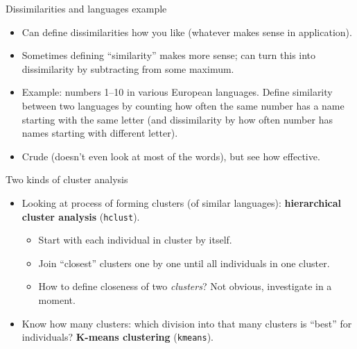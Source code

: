 \documentclass[unknownkeysallowed]{beamer}\usepackage[]{graphicx}\usepackage[]{color}
\begin{document}
\begin{frame}[fragile]{Dissimilarities and languages example}

  \begin{itemize}
  \item Can define dissimilarities how you like (whatever makes sense in application).
  \item Sometimes defining ``similarity'' makes more sense; can turn this into dissimilarity by subtracting from some maximum.
  \item Example: numbers 1--10 in various European languages. Define
    similarity between two languages by counting how often the same
    number has a name starting with the same letter (and dissimilarity
    by how often number has names starting with different letter).
  \item Crude (doesn't even look at most of the words), but see how effective.
  \end{itemize}
  
\end{frame}

\begin{frame}[fragile]{Two kinds of cluster analysis}

  \begin{itemize}
  \item Looking at process of forming clusters (of similar languages):
    \textbf{hierarchical cluster analysis} (\texttt{hclust}).
    \begin{itemize}
    \item Start with each individual in cluster by itself.
    \item Join ``closest'' clusters one by one until all individuals in one cluster.
    \item How to define closeness of two \emph{clusters}? Not obvious,
      investigate in a moment.
    \end{itemize}
  \item Know how many clusters: which division into that many clusters
    is ``best'' for individuals? \textbf{K-means clustering} (\texttt{kmeans}).
  \end{itemize}
  
\end{frame}
\end{document}
